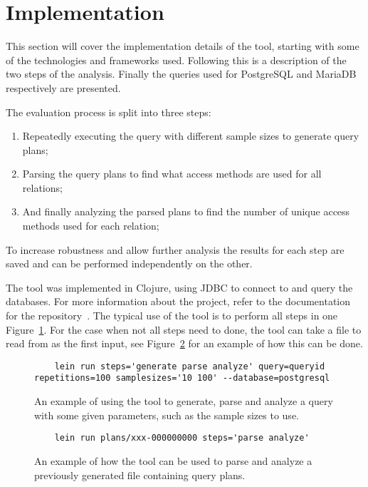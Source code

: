 \section{Implementation}\label{sec:implementation}
This section will cover the implementation details of the tool, starting with
some of the technologies and frameworks used. Following this is a description of
the two steps of the analysis. Finally the queries used for PostgreSQL and
MariaDB respectively are presented.

The evaluation process is split into three steps:
\begin{enumerate}
\item Repeatedly executing the query with different sample sizes to generate
  query plans;
\item Parsing the query plans to find what access methods are used for all
  relations;
\item And finally analyzing the parsed plans to find the number of unique access
  methods used for each relation;
\end{enumerate}

To increase robustness and allow further analysis the results for each step are
saved and can be performed independently on the other.

The tool was implemented in Clojure, using JDBC to connect to and query the
databases. For more information about the project, refer to the documentation for
the repository~\cite{barksten_mbark_m}. The typical use of the tool is to perform all steps in one
Figure~\ref{fig:cmd:runtool1}. For the case when not all steps need to done, the
tool can take a file to read from as the first input, see
Figure~\ref{fig:cmd:runtool2} for an example of how this can be done.

\begin{figure}[ht]
  \begin{verbatim}
    lein run steps='generate parse analyze' query=queryid repetitions=100 samplesizes='10 100' --database=postgresql
  \end{verbatim}
  \caption[Using the tool to generate, parse and analyze a query]{An example of
    using the tool to generate, parse and analyze a query with some given
    parameters, such as the sample sizes to use.}\label{fig:cmd:runtool1}
\end{figure}

\begin{figure}[ht]
  \begin{verbatim}
    lein run plans/xxx-000000000 steps='parse analyze'
  \end{verbatim}
  \caption[Using the tool to parse and analyze a previously generated plan]{An
    example of how the tool can be used to parse and analyze a previously
    generated file containing query plans.}\label{fig:cmd:runtool2}
\end{figure}

